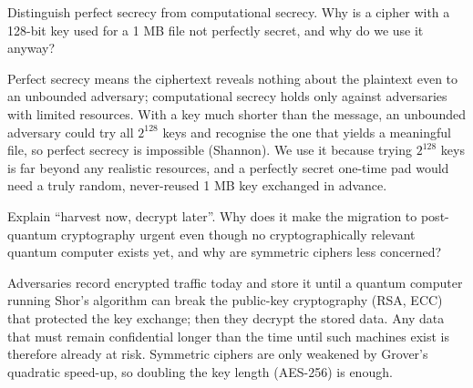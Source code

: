 \begin{exercise}
Distinguish perfect secrecy from computational secrecy. Why is a cipher with a 128-bit key used for a 1 MB file not perfectly secret, and why do we use it anyway?
\end{exercise}
\begin{solution}
Perfect secrecy means the ciphertext reveals nothing about the plaintext even to an unbounded adversary; computational secrecy holds only against adversaries with limited resources. With a key much shorter than the message, an unbounded adversary could try all $2^{128}$ keys and recognise the one that yields a meaningful file, so perfect secrecy is impossible (Shannon). We use it because trying $2^{128}$ keys is far beyond any realistic resources, and a perfectly secret one-time pad would need a truly random, never-reused 1 MB key exchanged in advance.
\end{solution}

\begin{exercise}
Explain \enquote{harvest now, decrypt later}. Why does it make the migration to post-quantum cryptography urgent even though no cryptographically relevant quantum computer exists yet, and why are symmetric ciphers less concerned?
\end{exercise}
\begin{solution}
Adversaries record encrypted traffic today and store it until a quantum computer running Shor's algorithm can break the public-key cryptography (RSA, ECC) that protected the key exchange; then they decrypt the stored data. Any data that must remain confidential longer than the time until such machines exist is therefore already at risk. Symmetric ciphers are only weakened by Grover's quadratic speed-up, so doubling the key length (AES-256) is enough.
\end{solution}
